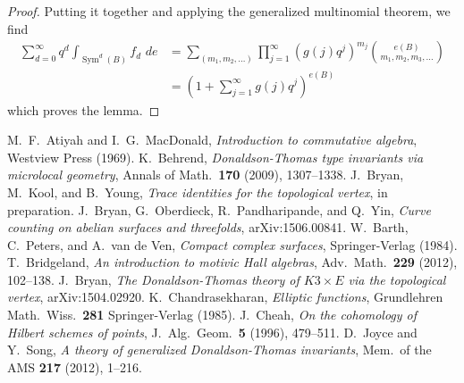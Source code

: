 \documentclass{amsart}
\theoremstyle{definition}
\newcommand{\Sym}{\operatorname{Sym}}
\begin{document}
\begin{proof}
Putting it together and applying the generalized multinomial theorem,
we find
\begin{align*}
\sum _{d=0}^{\infty } q^d \int _{\Sym ^{d} (B)}f_{d}\,\,de & = \sum _{(m_{1},m_{2},\dots )} \prod _{j=1}^{\infty } \left(g (j) q^{j} \right)^{m_{j}} \binom{e (B)}{m_{1},m_{2},m_{3},\dots }\\
&=\left(1+\sum _{j=1}^{\infty }g (j) q^{j} \right)^{e (B)}
\end{align*}
which proves the lemma.   
\end{proof}

     
\begin{thebibliography}{MNOP2}
 M.~F.~Atiyah and I.~G.~MacDonald, \textit{Introduction to commutative algebra}, Westview Press (1969).
 K.~Behrend, \textit{Donaldson-Thomas type invariants via microlocal geometry}, Annals of Math.~\textbf{170} (2009), 1307--1338.
 J.~Bryan, M.~Kool, and B.~Young, \textit{Trace identities for the topological vertex}, in preparation.
 J.~Bryan, G.~Oberdieck, R.~Pandharipande, and Q.~Yin, \emph{Curve counting on abelian surfaces and threefolds}, arXiv:1506.00841.
 W.~Barth, C.~Peters, and A.~van de Ven, \textit{Compact complex surfaces}, Springer-Verlag (1984).
 T.~Bridgeland, \textit{An introduction to motivic Hall algebras}, Adv.~Math.~\textbf{229} (2012), 102--138.
 J.~Bryan, \textit{The Donaldson-Thomas theory of $K3 \times E$ via the topological vertex}, arXiv:1504.02920.
 K.~Chandrasekharan, \emph{Elliptic functions}, Grundlehren Math.~Wiss.~\textbf{281} Springer-Verlag (1985).
 J.~Cheah, \textit{On the cohomology of Hilbert schemes of points}, J.~Alg.~Geom.~\textbf{5} (1996), 479--511.
 D.~Joyce and Y.~Song, \textit{A theory of generalized Donaldson-Thomas invariants}, Mem.~of the AMS \textbf{217} (2012), 1--216.

\end{thebibliography}
\end{document}
